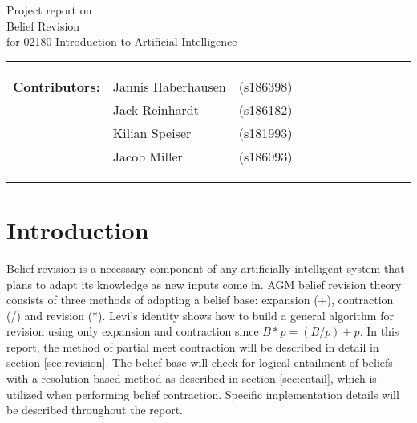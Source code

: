 \documentclass[a4paper,10pt]{article}
\begin{document}
\begin{center}
Project report on\\
\vspace{0.5cm}
{{\Large \sc Belief Revision}} \\
\vspace{0.5cm} for 02180 Introduction to Artificial Intelligence
\end{center}
\rule{\textwidth}{0.5pt}
\begin{description}
\item\begin{tabular}{rll}
    \textbf{Contributors:}  & Jannis Haberhausen  & (s186398) \\
                            & Jack Reinhardt      & (s186182) \\
                            & Kilian Speiser      & (s181993) \\
                            & Jacob Miller        & (s186093) \\
\end{tabular}
\end{description}
\rule{\textwidth}{1pt}

\tableofcontents
\newpage

\section{Introduction}
\label{sec:intro}
Belief revision is a necessary component of any artificially intelligent system that plans to adapt its knowledge as new inputs come in. AGM belief revision theory
consists of three methods of adapting a belief base: expansion (+), contraction (/) and revision (*). Levi's identity shows how to build a general algorithm for revision
using only expansion and contraction since $B*p=(B/p)+p$. In this report, the method of partial meet contraction will be described in detail in section \ref{sec:revision}.
The belief base will check for logical entailment of beliefs with a resolution-based method as described in section \ref{sec:entail}, which is utilized when performing
belief contraction. Specific implementation details will be described throughout the report.
\end{document}
